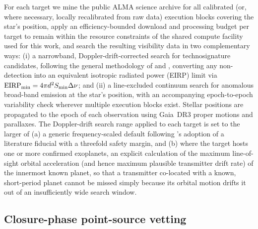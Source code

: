 \documentclass{openjournal}
\begin{document}
For each target we mine the public ALMA science archive for all calibrated (or,
where necessary, locally recalibrated from raw data) execution blocks covering
the star's position, apply an efficiency-bounded download and processing budget
per target to remain within the resource constraints of the shared compute
facility used for this work, and search the resulting visibility data in two
complementary ways: (i) a narrowband, Doppler-drift-corrected search for
technosignature candidates, following the general methodology of
\citet{Mason2024} and \citet{Enriquez2017}, converting any non-detection into an
equivalent isotropic radiated power (EIRP) limit via
$\mathrm{EIRP_{min}} = 4\pi d^{2} S_{\rm min} \Delta\nu$; and (ii) a
line-excluded continuum search for anomalous broad-band emission at the star's
position, with an accompanying epoch-to-epoch variability check wherever
multiple execution blocks exist. Stellar positions are propagated to the epoch
of each observation using Gaia~DR3 proper motions and parallaxes. The
Doppler-drift search range applied to each target is set to the larger of (a) a
generic frequency-scaled default following \citet{Mason2024}'s adoption of a
literature fiducial with a threefold safety margin, and (b) where the target
hosts one or more confirmed exoplanets, an explicit calculation of the maximum
line-of-sight orbital acceleration (and hence maximum plausible transmitter
drift rate) of the innermost known planet, so that a transmitter co-located with
a known, short-period planet cannot be missed simply because its orbital motion
drifts it out of an insufficiently wide search window.

\subsection{Closure-phase point-source vetting}
\label{sec:closurephase}
\end{document}
